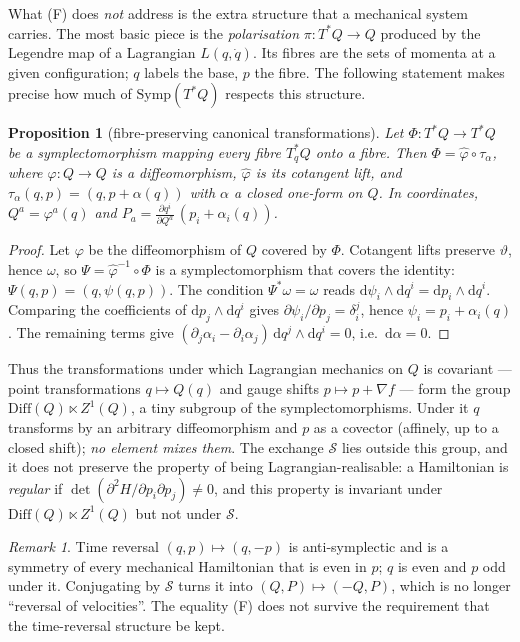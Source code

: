 \documentclass[11pt,a4paper]{article}
\newtheorem{proposition}[theorem]{Proposition}
\theoremstyle{definition}
\theoremstyle{remark}
\newtheorem{remark}[theorem]{Remark}
\newcommand{\dd}{\mathrm{d}}
\newcommand{\Sw}{\mathcal{S}}
\begin{document}
What (F) does \emph{not} address is the extra structure that a mechanical system carries. The most basic piece is the \emph{polarisation} $\pi:T^*Q\to Q$ produced by the Legendre map of a Lagrangian $L(q,\dot q)$. Its fibres are the sets of momenta at a given configuration; $q$ labels the base, $p$ the fibre. The following statement makes precise how much of $\mathrm{Symp}(T^*Q)$ respects this structure.

\begin{proposition}[fibre-preserving canonical transformations]\label{prop:fibre}
Let $\Phi:T^*Q\to T^*Q$ be a symplectomorphism mapping every fibre $T^*_qQ$ onto a fibre. Then $\Phi=\hat\varphi\circ\tau_\alpha$, where $\varphi:Q\to Q$ is a diffeomorphism, $\hat\varphi$ is its cotangent lift, and $\tau_\alpha(q,p)=(q,p+\alpha(q))$ with $\alpha$ a \emph{closed} one-form on $Q$. In coordinates, $Q^a=\varphi^a(q)$ and $P_a=\frac{\partial q^i}{\partial Q^a}\,(p_i+\alpha_i(q))$.
\end{proposition}

\begin{proof}
Let $\varphi$ be the diffeomorphism of $Q$ covered by $\Phi$. Cotangent lifts preserve $\vartheta$, hence $\omega$, so $\Psi=\hat\varphi^{-1}\circ\Phi$ is a symplectomorphism that covers the identity: $\Psi(q,p)=(q,\psi(q,p))$. The condition $\Psi^*\omega=\omega$ reads
$\dd\psi_i\wedge\dd q^i=\dd p_i\wedge\dd q^i$. Comparing the coefficients of $\dd p_j\wedge\dd q^i$ gives $\partial\psi_i/\partial p_j=\delta_i^j$, hence $\psi_i=p_i+\alpha_i(q)$. The remaining terms give $(\partial_j\alpha_i-\partial_i\alpha_j)\,\dd q^j\wedge\dd q^i=0$, i.e.\ $\dd\alpha=0$.
\end{proof}

Thus the transformations under which Lagrangian mechanics on $Q$ is covariant --- point transformations $q\mapsto Q(q)$ and gauge shifts $p\mapsto p+\nabla f$ --- form the group $\mathrm{Diff}(Q)\ltimes Z^1(Q)$, a tiny subgroup of the symplectomorphisms. Under it $q$ transforms by an arbitrary diffeomorphism and $p$ as a covector (affinely, up to a closed shift); \emph{no element mixes them}. The exchange $\Sw$ lies outside this group, and it does not preserve the property of being Lagrangian-realisable: a Hamiltonian is \emph{regular} if $\det(\partial^2H/\partial p_i\partial p_j)\neq0$, and this property is invariant under $\mathrm{Diff}(Q)\ltimes Z^1(Q)$ but not under $\Sw$.

\begin{remark}
Time reversal $(q,p)\mapsto(q,-p)$ is anti-symplectic and is a symmetry of every mechanical Hamiltonian that is even in $p$; $q$ is even and $p$ odd under it. Conjugating by $\Sw$ turns it into $(Q,P)\mapsto(-Q,P)$, which is no longer ``reversal of velocities''. The equality (F) does not survive the requirement that the time-reversal structure be kept.
\end{remark}
\end{document}
